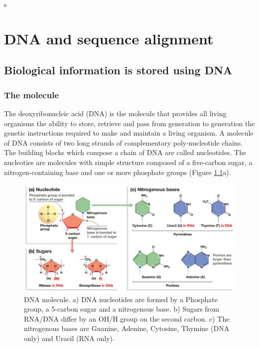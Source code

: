 s\chapter{DNA and sequence alignment}
\label{chap1:DNA-align}
\section{Biological information is stored using DNA}
\label{sec:chap1:DNA}
\subsection{The molecule}
\label{sec:chap1:DNA-molecule}
The deoxyribonucleic acid (DNA) is the molecule that provides all
living organisms the ability to store, retrieve and pass from
generation to generation the genetic instructions required to make and
maintain a living organism. A molecule of DNA consists of two long
strands of complementary poly-nucleotide chains. The building blocks
which compose a chain of DNA are called nucleotides. The nucleoties are
molecules with simple structure composed of a five-carbon sugar, a
nitrogen-containing base and one or more phosphate groups (Figure
\ref{fig:chap1:nucleotide}a).

\begin{figure}[h]
	\begin{minipage}[b]{\linewidth}
	  \centering
	  \includegraphics[width=\textwidth]{figures/chap1_nucleotide}
	  \caption{DNA molecule. a) DNA nucleotides are formed by a
       Phosphate group, a 5-carbon sugar and a nitrogenous base. b)
       Sugars from RNA/DNA differ by an OH/H group on the second
       carbon. c) The nitrogenous bases are Guanine, Adenine,
       Cytosine, Thymine (DNA only) and Uracil (RNA only).}
	  \label{fig:chap1:nucleotide}
   \end{minipage}
\end{figure}

